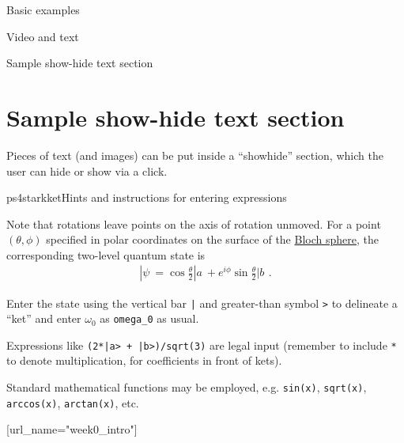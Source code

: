 \begin{edXchapter}{Basic examples}
\begin{edXsequential}{Video and text}
\begin{edXvertical}
\begin{edXtext}{Sample show-hide text section}

\section*{Sample show-hide text section}

Pieces of text (and images) can be put inside a ``showhide'' section, which the user can hide or show via a click.

\begin{edXshowhide}{ps4starkket}{Hints and instructions for entering expressions}

Note that rotations leave points on the axis of rotation unmoved.  For
a point $(\theta, \phi)$ specified in polar coordinates on the surface
of the \href{http://en.wikipedia.org/wiki/Bloch_sphere}{Bloch sphere},
the corresponding two-level quantum state is
\begin{eqnarray}
	|\psi\> = \cos\frac{\theta}{2} |a\> +
        e^{i\phi}\sin\frac{\theta}{2} |b\>
\,.
\end{eqnarray}

Enter the state using the vertical bar \texttt{|} and greater-than
symbol \texttt{>} to delineate a ``ket'' and enter $\omega_0$ as \texttt{omega_0} as usual.

Expressions like \texttt{(2*|a> + |b>)/sqrt(3)} are legal input
(remember to include \texttt{*} to denote multiplication, for
coefficients in front of kets).

Standard mathematical functions may be employed, e.g. \texttt{sin(x)},
\texttt{sqrt(x)}, \texttt{arccos(x)},  \texttt{arctan(x)}, etc.  

\end{edXshowhide}

\end{edXtext}

\end{edXvertical}

\begin{edXvertical}

[url_name="week0_intro"]

\end{edXvertical}

\end{edXsequential}

\end{edXchapter}
